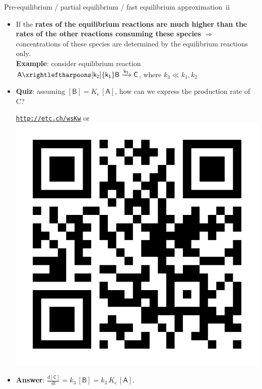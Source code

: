\begin{frame}{Pre-equilibrium / partial equilibrium / fast equilibrium approximation \,ii}
	\small
	\begin{itemize}
	   	\item[(ii)] If the {\bf  rates of the equilibrium reactions are much higher than the rates of the other reactions consuming 
				these species} $\Rightarrow$  concentrations of these species are determined by the equilibrium reactions only.\\
			{\bf Example}: consider equilibrium reaction $\mathsf{A \xrightleftharpoons[k_2]{k_1} B \xrightarrow{k_3} C}$, where $k_3 \ll k_1, k_2$ \\
		\item \alert{\bf Quiz}: assuming $\mathsf{[B]} = K_e \, \mathsf{[A]}$, how can we express the production rate of C?		
		\begin{center}
			\href{http://etc.ch/wsKw}{\textcolor{indigo(dye)}{\tt http://etc.ch/wsKw}} \quad or \quad 
			\includegraphics[height=0.18\columnwidth]{figures/chemical-kinetics/polls.png}
		\end{center}
		\hiddenpause
		\vskip 10pt
		\item  {\bf Answer}: $\tfrac{d\mathsf{[C]}}{dt} = k_3 \, \mathsf{[B]} = k_3\, K_e \, \mathsf{[A]}$.	
		\end{itemize}	
\end{frame}
%
%
%

